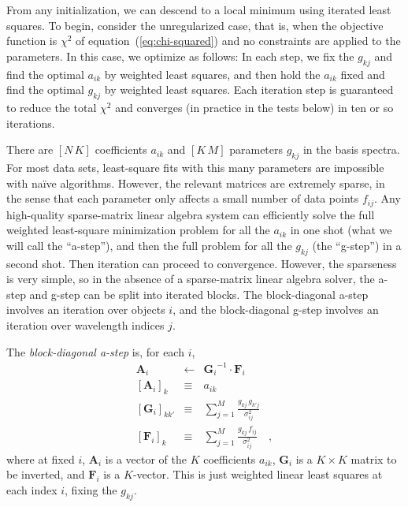 \documentclass[12pt,preprint]{aastex}
\newcommand{\equationname}{equation}
\newcommand{\tv}[1]{\boldsymbol{#1}}
\newcommand{\inverse}[1]{{#1}^{-1}}
\begin{document}
From any initialization, we can descend to a local minimum using
iterated least squares.  To begin, consider the unregularized case,
that is, when the objective function is $\chi^2$ of
\equationname~(\ref{eq:chi-squared}) and no constraints are applied to
the parameters.  In this case, we optimize as follows: In each step,
we fix the $g_{kj}$ and find the optimal $a_{ik}$ by weighted least
squares, and then hold the $a_{ik}$ fixed and find the optimal
$g_{kj}$ by weighted least squares. Each iteration step is guaranteed
to reduce the total $\chi^2$ and converges (in practice in the tests
below) in ten or so iterations.

There are $[N\,K]$ coefficients $a_{ik}$ and $[K\,M]$ parameters
$g_{kj}$ in the basis spectra.  For most data sets, least-square fits
with this many parameters are impossible with na\"ive algorithms.
However, the relevant matrices are extremely sparse, in the sense that
each parameter only affects a small number of data points $f_{ij}$.
Any high-quality sparse-matrix linear algebra system can efficiently
solve the full weighted least-square minimization problem for all the
$a_{ik}$ in one shot (what we will call the ``a-step''), and then the
full problem for all the $g_{kj}$ (the ``g-step'') in a second shot.
Then iteration can proceed to convergence.  However, the sparseness is
very simple, so in the absence of a sparse-matrix linear algebra
solver, the a-step and g-step can be split into iterated blocks.  The
block-diagonal a-step involves an iteration over objects $i$, and the
block-diagonal g-step involves an iteration over wavelength indices
$j$.

The \emph{block-diagonal a-step} is, for each $i$,
\begin{eqnarray}\label{eq:astep}\displaystyle
\tv{A}_i & \gets & \inverse{\tv{G}_i}\cdot\tv{F}_i \nonumber\\
\left[\tv{A}_i\right]_k & \equiv & a_{ik} \nonumber\\
\left[\tv{G}_i\right]_{kk'} & \equiv & \sum_{j=1}^{M} \frac{g_{kj}\,g_{k'j}}{\sigma_{ij}^2} \nonumber\\
\left[\tv{F}_i\right]_k     & \equiv & \sum_{j=1}^{M} \frac{g_{kj}\,f_{i j}}{\sigma_{ij}^2}
\quad ,
\end{eqnarray}
where at fixed $i$, $\tv{A}_i$ is a vector of the $K$ coefficients
$a_{ik}$, $\tv{G}_i$ is a $K\times K$ matrix to be inverted, and
$\tv{F}_i$ is a $K$-vector.  This is just weighted linear least
squares at each index $i$, fixing the $g_{kj}$.
\end{document}
